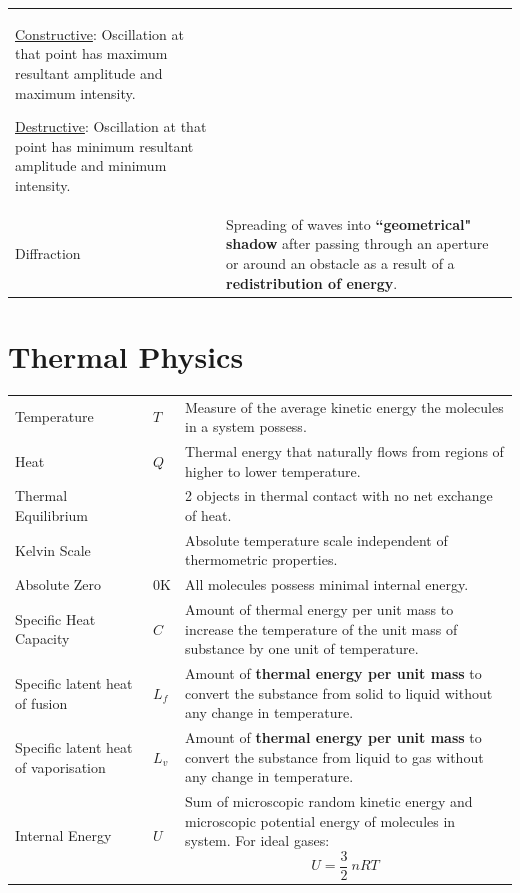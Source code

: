 \documentclass[a4paper,11pt]{article}
\begin{document}
\begin{center}
\begin{tabular}{@{} l p{10cm} @{}}
\begin{minipage}[t]{\textwidth}
\begin{itemize}
				\end{itemize}
			\end{minipage} \par 
			\underline{Constructive}: Oscillation at that point has maximum resultant amplitude and maximum intensity.\par
			\underline{Destructive}: Oscillation at that point has minimum resultant amplitude and minimum intensity.\\
			Diffraction & Spreading of waves into \textbf{``geometrical" shadow} after passing through an aperture or around an obstacle as a result of a \textbf{redistribution of energy}. \\
			\bottomrule
		\end{tabular}
	\end{center}
	\newpage
	\section{Thermal Physics}
		\begin{center}
			\renewcommand{\arraystretch}{1.5}
			\begin{tabular}{@{} l l p{8.5cm} @{}}
				\toprule
				Temperature & $T$ & Measure of the average kinetic energy the molecules in a system possess. \\
				Heat & $Q$ & Thermal energy that naturally flows from regions of higher to lower temperature. \\
				Thermal Equilibrium & & 2 objects in thermal contact with no net exchange of heat. \\
				Kelvin Scale & & Absolute temperature scale independent of thermometric properties. \\
				Absolute Zero & 0K & All molecules possess minimal internal energy. \\
				Specific Heat Capacity & $C$ & Amount of thermal energy per unit mass to increase the temperature of the unit mass of substance by one unit of temperature. \\
				Specific latent heat of fusion & $L_f$ & Amount of \textbf{thermal energy per unit mass} to convert the substance from solid to liquid without any change in temperature. \\
				Specific latent heat of vaporisation & $L_v$ & Amount of \textbf{thermal energy per unit mass} to convert the substance from liquid to gas without any change in temperature. \\
				Internal Energy & $U$ & Sum of microscopic random kinetic energy and microscopic potential energy of molecules in system. For ideal gases: $$U=\frac{3}{2}~nRT$$ \vspace*{-\baselineskip} \\ 
				\bottomrule
			\end{tabular}
		\end{center}
\end{document}
